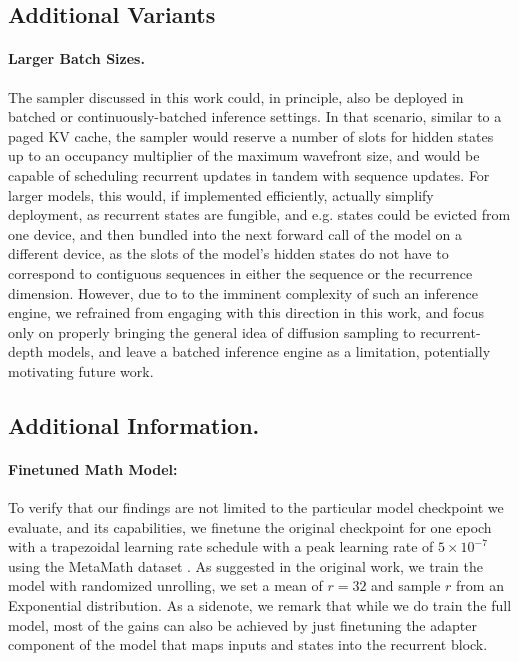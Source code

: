 \documentclass{article} %
\theoremstyle{definition}
\theoremstyle{plain}
\begin{document}
\subsection{Additional Variants}\label{app:batch_engine}



\paragraph{Larger Batch Sizes.}
The sampler discussed in this work could, in principle, also be deployed in batched or continuously-batched inference settings. In that scenario, similar to a paged KV cache, the sampler would reserve a number of slots for hidden states up to an occupancy multiplier of the maximum wavefront size, and would be capable of scheduling recurrent updates in tandem with sequence updates. For larger models, this would, if implemented efficiently, actually simplify deployment, as recurrent states are fungible, and e.g. states could be evicted from one device, and then bundled into the next forward call of the model on a different device, as the slots of the model's hidden states do not have to correspond to contiguous sequences in either the sequence or the recurrence dimension. However, due to to the imminent complexity of such an inference engine, we refrained from engaging with this direction in this work, and focus only on properly bringing the general idea of diffusion sampling to recurrent-depth models, and leave a batched inference engine as a limitation, potentially motivating future work.

\subsection{Additional Information.}

\paragraph{Finetuned Math Model:}
To verify that our findings are not limited to the particular model checkpoint we evaluate, and its capabilities, we finetune the original checkpoint for one epoch with a trapezoidal learning rate schedule with a peak learning rate of $5 \times 10^{-7}$ using the MetaMath dataset \citep{yu_metamath_2023}. As suggested in the original work, we train the model with randomized unrolling, we set a mean of $r=32$ and sample $r$ from an Exponential distribution. As a sidenote, we remark that while we do train the full model, most of the gains can also be achieved by just finetuning the adapter component of the model that maps inputs and states into the recurrent block. 
\end{document}
